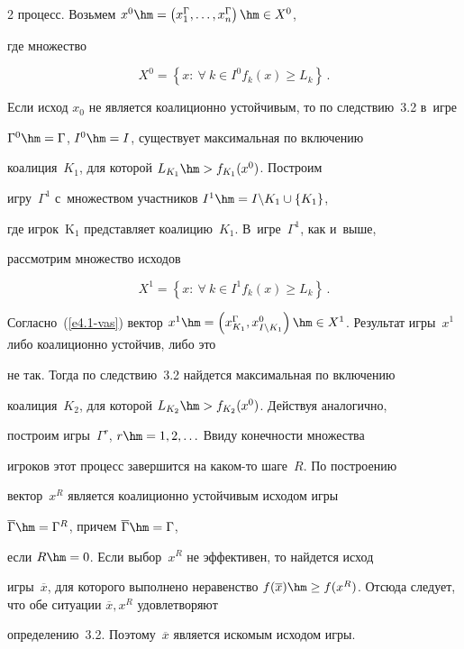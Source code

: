 \begin{multicols}{2}
процесс. Возьмем $x^0\hm= \left( x_1^\Gamma,\ldots, x_n^\Gamma\right) \hm\in X^0$,

где множество

    $$

    X^0= \left\{ x:\ \forall\ k\in I^0 f_k(x)\geq L_k\right\}\,.

    $$

Если исход $x_0$ не является коалиционно устойчивым, то по следствию~3.2 в~игре

$\Gamma^0\hm= \Gamma$, $I^0\hm=I$, существует максимальная по включению

коалиция~$K_1$, для которой $L_{K_1}\hm> f_{K_1}(x^0)$. Построим

игру~$\Gamma^1$ с~множеством участников $I^1\hm= I\backslash K_1 \cup \{K_1\}$,

где игрок~K$_1$ представляет коалицию~$K_1$. В~игре~$\Gamma^1$, как и~выше,

рассмотрим множество исходов

$$

X^1= \left\{ x:\ \forall\ k\in I^1 f_k(x)\geq L_k\right\}\,.

$$

Согласно~(\ref{e4.1-vas}) вектор $x^1\hm= \left( x^\Gamma_{K_1}, x^0_{I\backslash

K_1}\right) \hm\in X^1$. Результат игры~$x^1$ либо коалиционно устойчив, либо это

не так. Тогда по следствию~3.2 найдется максимальная по включению

коалиция~$K_2$, для которой $L_{K_2}\hm> f_{K_2}(x^0)$. Действуя аналогично,

построим игры~$\Gamma^r$, $r\hm=1,2,\ldots$ Ввиду конечности множества

игроков этот процесс завершится на ка\-ком-то шаге~$R$. По построению

вектор~$x^R$ является коалиционно устойчивым исходом игры

$\overline{\Gamma}\hm= \Gamma^R$, причем $\overline{\Gamma}\hm= \Gamma$,

если $R\hm=0$. Если выбор~$x^R$ не эффективен, то найдется исход

игры~$\overline{x}$, для которого выполнено неравенство $f(\overline{x}) \hm\geq

f(x^R)$. Отсюда следует, что обе ситуации $\overline{x},x^R$ удовлетворяют

определению~3.2. Поэтому~$\overline{x}$ является искомым исходом игры.




\end{multicols}
